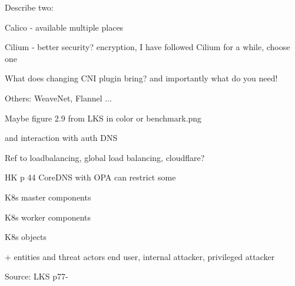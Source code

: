 \documentclass[Screen16to9,17pt]{foils}
\begin{document}

Describe two:
\begin{list2}
\item Calico - available multiple places
\item Cilium - better security? encryption, I have followed Cilium for a while, choose one
\item What does changing CNI plugin bring? and importantly what do you need!
\end{list2}


\begin{list2}
\item {}

\item Others: WeaveNet, Flannel ...

\item Maybe figure 2.9 from LKS in color or benchmark.png
\end{list2}



\begin{list2}
\item and interaction with auth DNS
\end{list2}

Ref to loadbalancing, global load balancing, cloudflare?

HK p 44 CoreDNS with OPA can restrict some


\begin{list2}
\item
\end{list2}


\begin{list2}
\item K8s master components
\item K8s worker components
\item K8s objects
\end{list2}

+ entities and threat actors end user, internal attacker, privileged attacker

Source: LKS p77-

\end{document}
